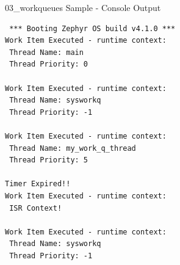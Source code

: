 \documentclass[10pt, aspectratio=169]{beamer}
\begin{document}
\begin{frame}[fragile]{03\_workqueues Sample - Console Output}
  \begin{listing}[H]
    \begin{verbatim}
 *** Booting Zephyr OS build v4.1.0 ***
Work Item Executed - runtime context:
 Thread Name: main
 Thread Priority: 0

Work Item Executed - runtime context:
 Thread Name: sysworkq
 Thread Priority: -1

Work Item Executed - runtime context:
 Thread Name: my_work_q_thread
 Thread Priority: 5

Timer Expired!!
Work Item Executed - runtime context:
 ISR Context!

Work Item Executed - runtime context:
 Thread Name: sysworkq
 Thread Priority: -1
    \end{verbatim}
  \end{listing}
\end{frame}
\end{document}
